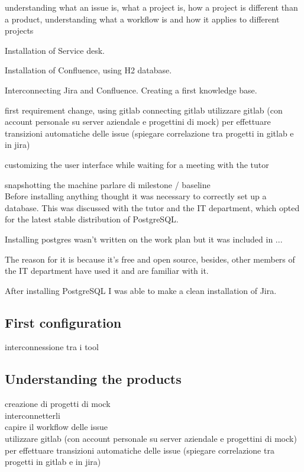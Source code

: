 	understanding what an issue is, what a project is, how a project is different than a product, understanding what a workflow is and how it applies to different projects
	
	Installation of Service desk.
	
	Installation of Confluence, using H2 database.
	
	
	Interconnecting Jira and Confluence.
	Creating a first knowledge base.
	
	
	first requirement change, using gitlab
	connecting gitlab
	utilizzare gitlab (con account personale su server aziendale e progettini di mock) per effettuare transizioni automatiche delle issue (spiegare correlazione tra progetti in gitlab e in jira)
	
	customizing the user interface while waiting for a meeting with the tutor
	
	
	snapshotting the machine
	parlare di milestone / baseline\\
	
	
	
	
	Before installing anything thought it was necessary to correctly set up a database.
	This was discussed with the tutor and the IT department, which opted for the latest stable distribution of PostgreSQL.

	Installing postgres wasn't written on the work plan but it was included in ... 
	
	
	The reason for it is because it's free and open source, besides, other members of the IT department have used it and are familiar with it.
	
	After installing PostgreSQL I was able to make a clean installation of Jira.
	
	








	\subsection{First configuration}
		interconnessione tra i tool
	
	\subsection{Understanding the products}
		creazione di progetti di mock\\
		interconnetterli\\
		capire il workflow delle issue\\
		utilizzare gitlab (con account personale su server aziendale e progettini di mock) per effettuare transizioni automatiche delle issue (spiegare correlazione tra progetti in gitlab e in jira)

